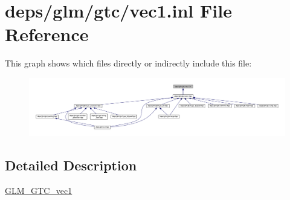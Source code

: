 \hypertarget{gtc_2vec1_8inl}{}\section{deps/glm/gtc/vec1.inl File Reference}
\label{gtc_2vec1_8inl}
This graph shows which files directly or indirectly include this file\+:
\nopagebreak
\begin{figure}[H]
\begin{center}
\leavevmode
\includegraphics[width=350pt]{d0/d76/gtc_2vec1_8inl__dep__incl}
\end{center}
\end{figure}


\subsection{Detailed Description}
\hyperlink{group__gtc__vec1}{G\+L\+M\+\_\+\+G\+T\+C\+\_\+vec1} 